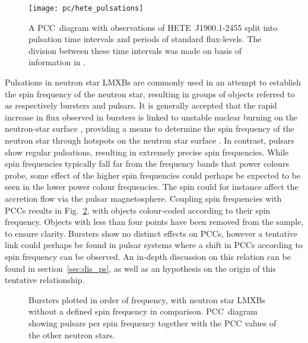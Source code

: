 \begin{figure}[p]
	\myfloatalign
	{\texttt{[image: pc/hete\_pulsations]}}
	\caption[\acsp{PCC} during intermittent pulsations]{A \ac{PCC}~diagram with observations of HETE~J1900.1-2455 split into pulsation time intervals and periods of standard flux-levels. The division between these time intervals was made on basis of information in \citet{galloway2006intermittent}.}\label{fig:hete_pulsations}
\end{figure}
\newpage
Pulsations in neutron star \acp{LMXB} are commonly used in an attempt to establish the spin frequency of the neutron star, resulting in groups of objects referred to as respectively bursters and pulsars. It is generally accepted that the rapid increase in flux observed in bursters is linked to unstable nuclear burning on the neutron-star surface \citep[e.g.][]{klis2000millisecond}, providing a means to determine the spin frequency of the neutron star through hotspots on the neutron star surface \citep[see][]{chakrabarty2003nuclear,strohmayer2003new}. In contrast, pulsars show regular pulsations, resulting in extremely precise spin frequencies. While spin frequencies typically fall far from the frequency bands that power colours probe, some effect of the higher spin frequencies could perhaps be expected to be seen in the lower power colour frequencies. The spin could for instance affect the accretion flow via the pulsar magnetosphere. Coupling spin frequencies with \acp{PCC} results in Fig.~\ref{fig:spin}, with objects colour-coded according to their spin frequency. Objects with less than four points have been removed from the sample, to ensure clarity. Bursters show no distinct effects on \acp{PCC}, however a tentative link could perhaps be found in pulsar systems where a shift in \acp{PCC} according to spin frequency can be observed. An in-depth discussion on this relation can be found in section~\ref{sec:dis_ps}, as well as an hypothesis on the origin of this tentative relationship.\\

\begin{figure}[p]
	\myfloatalign
	\caption[The effect of spin frequency on \acsp{PCC}]{ Bursters plotted in order of frequency, with neutron star \acp{LMXB} without a defined spin frequency in comparison.  \ac{PCC}~diagram showing pulsars per spin frequency together with the \ac{PCC} values of the other neutron stars.}\label{fig:spin}
\end{figure}